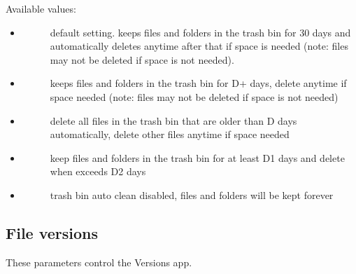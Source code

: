 \documentclass[letterpaper,10pt,english]{sphinxmanual}
\begin{document}
Available values:
\begin{itemize}
\item {} \begin{description}
\item[{}] \leavevmode
default setting. keeps files and folders in the trash bin for 30 days
and automatically deletes anytime after that if space is needed (note:
files may not be deleted if space is not needed).

\end{description}

\item {} \begin{description}
\item[{}] \leavevmode
keeps files and folders in the trash bin for D+ days, delete anytime if
space needed (note: files may not be deleted if space is not needed)

\end{description}

\item {} \begin{description}
\item[{}] \leavevmode
delete all files in the trash bin that are older than D days
automatically, delete other files anytime if space needed

\end{description}

\item {} \begin{description}
\item[{}] \leavevmode
keep files and folders in the trash bin for at least D1 days and
delete when exceeds D2 days

\end{description}

\item {} \begin{description}
\item[{}] \leavevmode
trash bin auto clean disabled, files and folders will be kept forever

\end{description}

\end{itemize}


\subsection{File versions}
\label{configuration_server/config_sample_php_parameters:file-versions}
These parameters control the Versions app.
\end{document}
